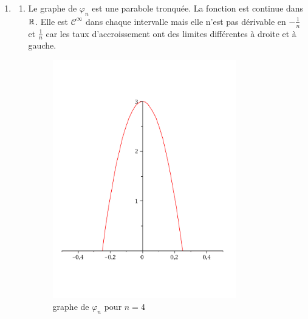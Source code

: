 \begin{enumerate}
 \item \begin{enumerate}
 \item Le graphe de $\varphi_n$ est une parabole tronquée.
La fonction est continue dans $\mathbb{R}$. Elle est $\mathcal C^\infty$ dans chaque intervalle mais elle n'est pas dérivable en $-\frac{1}{n}$ et $\frac{1}{n}$ car les taux d'accroissement ont des limites différentes à droite et à gauche.
\begin{figure}[ht]
 \centering
 \includegraphics[width=8cm]{Cconv1_1.pdf}
 \caption{graphe de $\varphi_n$ pour $n=4$}
\end{figure}


\end{enumerate}
\end{enumerate}
